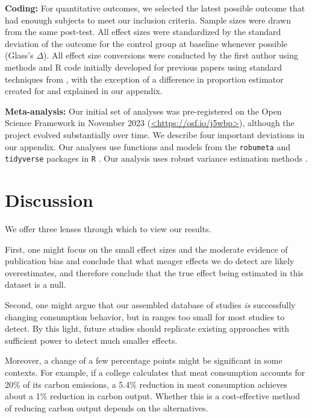 \documentclass[sn-nature,pdflatex]{sn-jnl}
\begin{document}
\textbf{Coding:} For quantitative outcomes, we selected the latest
possible outcome that had enouugh subjects to meet our inclusion
criteria. Sample sizes were drawn from the same post-test. All effect
sizes were standardized by the standard deviation of the outcome for the
control group at baseline whenever possible (Glass's \(\Delta\)). All
effect size conversions were conducted by the first author using methods
and R code initially developed for previous papers
\citep{paluck2019, paluck2021, porat2024} using standard techniques from
\citep{cooper2019}, with the exception of a difference in proportion
estimator created for \citep{paluck2021} and explained in our appendix.

\textbf{Meta-analysis:} Our initial set of analyses was pre-registered
on the Open Science Framework in November 2023
(\url{<https://osf.io/j5wbp>}), although the project evolved
substantially over time. We describe four important deviations in our
appendix. Our analyses use functions and models from the
\texttt{robumeta} \citep{fisher2015} and \texttt{tidyverse}
\citep{wickham2019} packages in \texttt{R} \citep{Rlang}. Our analysis
uses robust variance estimation methods \citep{hedges2010}.

\section{Discussion}\label{Sec4}

We offer three lenses through which to view our results.

First, one might focus on the small effect sizes and the moderate
evidence of publication bias and conclude that what meager effects we do
detect are likely overestimates, and therefore conclude that the true
effect being estimated in this dataset is a null.

Second, one might argue that our assembled database of studies \emph{is}
successfully changing consumption behavior, but in ranges too small for
most studies to detect. By this light, future studies should replicate
existing approaches with sufficient power to detect much smaller
effects.

Moreover, a change of a few percentage points might be significant in
some contexts. For example, if a college calculates that meat
consumption accounts for 20\% of its carbon emissions, a 5.4\% reduction
in meat consumption \citep{jalil2023} achieves about a 1\% reduction in
carbon output. Whether this is a cost-effective method of reducing
carbon output depends on the alternatives.
\end{document}

